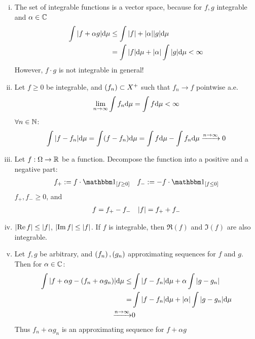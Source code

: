 \documentclass[../../script.tex]{subfiles}
\begin{document}
\begin{rem}
    \begin{enumerate}[(i)]
        \item The set of integrable functions is a vector space, because for $f, g$ integrable and $\alpha \in \cmpln$
        \begin{align*}
            \int \abs{f + \alpha g} \dd\mu &\le \int \abs{f} + \abs{\alpha}\abs{g} \dd\mu \\
            &= \int \abs{f} \dd\mu + \abs{\alpha} \int \abs{g} \dd\mu < \infty
        \end{align*}
        However, $f \cdot g$ is not integrable in general!

        \item Let $f \ge 0$ be integrable, and $\anyseqdef[f]{X^+}$ such that $f_n \rightarrow f$ pointwise a.e.
        \[
            \limn \int f_n \dd\mu = \int f \dd\mu < \infty
        \]
        $\forall n \in \natn$:
        \[
            \int \abs{f - f_n} \dd\mu = \int (f - f_n) \dd\mu = \int f \dd\mu - \int f_n \dd\mu \conv{n \rightarrow \infty} 0
        \]

        \item Let $f: \Omega \rightarrow \realn$ be a function. Decompose the function into a positive and a negative part:
        \begin{align*}
            f_+ := f \cdot \charfun_{[f \ge 0]} && f_- := -f \cdot \charfun_{[f \le 0]}
        \end{align*}
        $f_+, f_- \ge 0$, and 
        \begin{align*}
            f = f_+ - f_- && \abs{f} = f_+ + f_-
        \end{align*}

        \item $\abs{\Re f} \le \abs{f}$, $\abs{\Im f} \le \abs{f}$. If $f$ is integrable, then $\Re(f)$ and $\Im(f)$ are also integrable.
        \item Let $f, g$ be arbitrary, and $\seq{f}, \seq{g}$ approximating sequences for $f$ and $g$. Then for $\alpha \in \cmpln$:
        \begin{align*}
            \int \abs{f + \alpha g - (f_n + \alpha g_n)} \dd\mu \le &\int \abs{f - f_n} \dd\mu + \alpha \int \abs{g - g_n} \\
            = &\int \abs{f - f_n} \dd\mu + \abs{\alpha} \int \abs{g - g_n} \dd\mu \\
            \conv{n \rightarrow \infty} &0
        \end{align*}
        Thus $f_n + \alpha g_n$ is an approximating sequence for $f + \alpha g$


\end{enumerate}
\end{rem}
\end{document}
